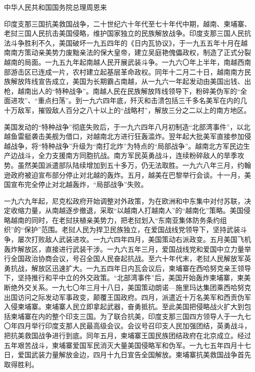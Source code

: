 中华人民共和国国务院总理周恩来

\begin{maonote}
印度支那三国抗美救国战争，二十世纪六十年代至七十年代中期，越南、柬埔寨、老挝三国人民抗击美国侵略，维护国家独立的民族解放战争。印度支那三国人民抗法斗争胜利不久，美国破坏一九五四年的《日内瓦协议》，于一九五五年十月在越南南方策动亲美势力废黜亲法的保大皇帝，建立吴庭艳傀儡政权，制造了正式分裂越南的局面。一九五九年起南越人民开展武装斗争。一九六〇年上半年，南越西南部游击区已连成一片，农村建立起基层革命政权。同年十二月二十日，越南南方民族解放阵线宣告成立，美国为长期霸占南越，从一九六一年起发动由美国出钱、出枪，越南出人的“特种战争”。南越人民在民族解放阵线领导下，粉碎美伪军的“全面进攻”、“重点扫荡”。到一九六四年底，歼灭和击溃包括三千多名美军在内的几十万敌军，摧毁敌人百分之八十以上的“战略村”，解放三分之二以上的南方地区。

美国发动的“特种战争”彻底失败后，于一九六四年八月初制造“北部湾事件”，以北越鱼雷艇袭击美舰为借口，对越南北方进行狂轰滥炸。翌年起大批美军直接参加侵越战争，将“特种战争”升级为“南打北炸”为特点的“局部战争”。越南北方军民边生产边战斗，全力支援南方同胞抗战。南方军民英勇战斗，连续粉碎敌人的旱季攻势。虽然美国派遣部队陆续增加到五十多万，仍无法取胜。一九六八年三月，约翰逊政府被迫宣布部分停止对北越的轰炸。五月，越美在巴黎举行会谈。十一月，美国宣布完全停止对北越轰炸，“局部战争”失败。

一九六九年起，尼克松政府开始调整对外政策，为在欧洲和中东集中对付苏联，决定收缩力量，从南越逐步撤退，采取“以越南人打越南人”的“越南化”策略。美国侵略越南的同时，在老挝扶植亲美势力，把老挝划入“东南亚集体防务条约组织”的“保护”范围。老挝人民为捍卫民族独立，在爱国战线党领导下，坚持武装斗争，屡次打败敌人武装进攻。一九六四年四月，美国策动右派政变。五月美国飞机轰炸解放区，直接进行武装干涉。一九六五年三月，爱国战线党和爱国中立力量举行全国政治协商会议，号召全国人民奋起抗战。至六十年代末，老挝人民解放军英勇抗战，解放区迅速扩大。一九五四年日内瓦会议后，柬埔寨在西哈努克亲王领导下，坚持推行和平中立的外交政策。“北部湾事件”后，美国开始轰炸柬埔寨，柬美断绝外交关系。一九七〇年三月十八日，美国策动朗诺—施里玛达集团乘西哈努克出国访问之际发动军事政变，颠覆王国政府。四月，派遣近十万名美军和西贡伪军入侵柬埔寨。柬埔寨人民立即拿起武器，奋勇抵抗。至此美国把侵略战火扩大到包括柬埔寨在内的整个印支三国。为了联合抗美，印度支那三国四方领导人于一九七〇年四月举行印度支那人民最高级会议。会议号召印支人民加强团结，英勇战斗，把抗美救国战争进行到底。同年五月，柬埔寨王国民族团结政府在北京成立。经过五年艰苦战斗，柬埔寨爱国军民消灭大量美国侵略军和伪军。一九七五年四月十七日，爱国武装力量解放金边，四月十九日宣告全国解放。柬埔寨抗美救国战争首先取得胜利。


\end{maonote}
